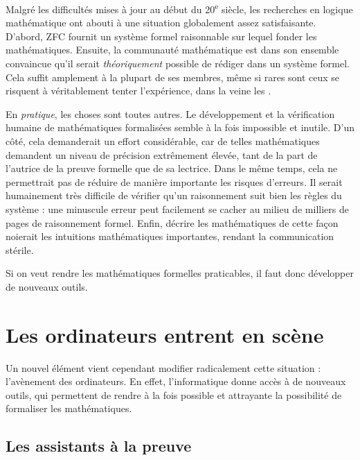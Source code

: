 Malgré les difficultés mises à jour au début du 20\textsuperscript{e}
siècle, les recherches en logique mathématique ont abouti à une situation
globalement assez satisfaisante. D’abord, ZFC fournit un système formel raisonnable sur
lequel fonder les mathématiques. Ensuite,
la communauté mathématique est dans son ensemble convaincue qu’il serait
\emph{théoriquement} possible de rédiger dans un système formel.
Cela suffit amplement à la plupart de ses membres,
même si rares sont ceux se risquent à véritablement tenter l’expérience, dans la veine
les .

En \emph{pratique}, les choses sont toutes autres.
Le développement et la vérification humaine de mathématiques
formalisées%
semble à la fois impossible et inutile.
D’un côté, cela demanderait un effort considérable, car de telles mathématiques
demandent un niveau de précision extrêmement élevée, tant de la part de l’autrice
de la preuve formelle que de sa lectrice.
Dans le même temps, cela ne permettrait pas de réduire de manière importante
les risques d’erreurs. Il serait
humainement très difficile de vérifier qu’un raisonnement suit bien les règles du
système : une minuscule erreur peut facilement se cacher au milieu de
milliers de pages de raisonnement formel.
Enfin, décrire les mathématiques de cette façon noierait
les intuitions mathématiques importantes, rendant la communication stérile.

Si on veut rendre les mathématiques formelles praticables, il faut donc développer
de nouveaux outils.

\section{Les ordinateurs entrent en scène}
\label{sec:assistants-preuve}

Un nouvel élément vient cependant modifier radicalement cette situation :
l’avènement des ordinateurs. En effet, l’informatique donne accès à de nouveaux outils,
qui permettent de rendre à la fois possible et attrayante la possibilité de formaliser
les mathématiques.

\subsection{Les assistants à la preuve}

